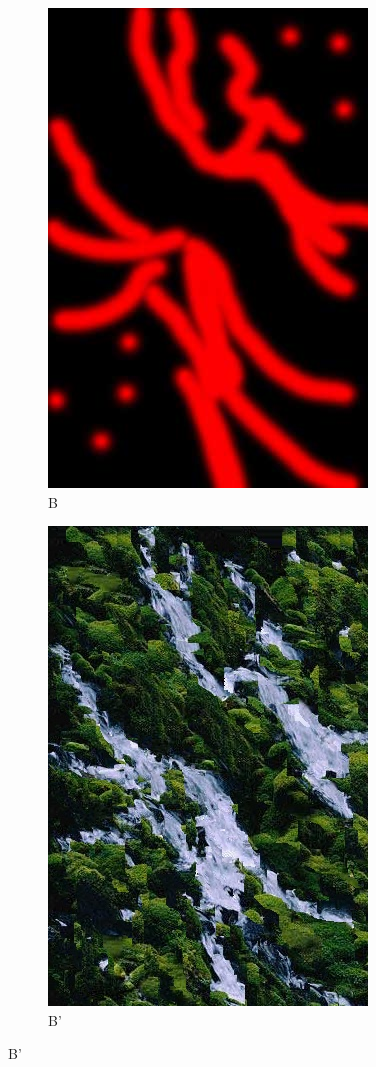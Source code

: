 \documentclass{article}
\begin{document}
\begin{figure}[!ht]
\begin{subfigure}{0.5\textwidth}
\centering
\includegraphics[width=0.75\linewidth]{waterfall-mask1.jpg}
\caption{B}
\end{subfigure}
\begin{subfigure}{0.5\textwidth}
\centering
\includegraphics[width=0.75\linewidth]{B_prime2.jpg}
\caption{B'}
\end{subfigure}
\end{figure}
\end{document}
